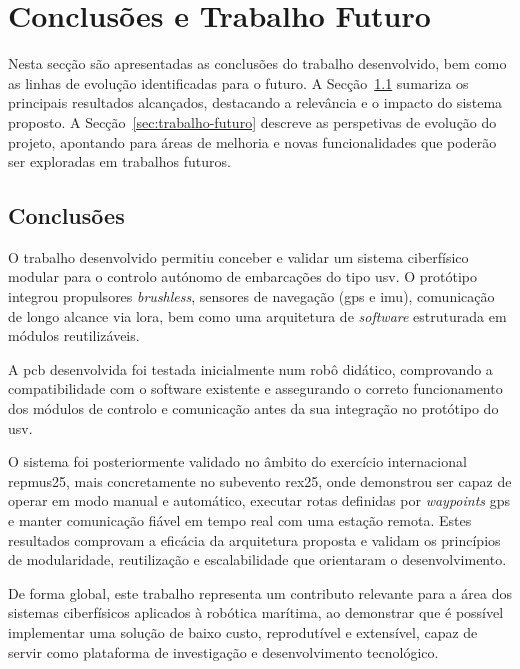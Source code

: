 \chapter{Conclusões e Trabalho Futuro}
\label{ch:conclusoesTrabalhoFuturo}

Nesta secção são apresentadas as conclusões do trabalho desenvolvido, bem como as linhas de evolução identificadas para o futuro. A Secção~\ref{sec:conclusoes} sumariza os principais resultados alcançados, destacando a relevância e o impacto do sistema proposto. A Secção~\ref{sec:trabalho-futuro} descreve as perspetivas de evolução do projeto, apontando para áreas de melhoria e novas funcionalidades que poderão ser exploradas em trabalhos futuros.

\section{Conclusões}
\label{sec:conclusoes}

O trabalho desenvolvido permitiu conceber e validar um sistema ciberfísico modular para o controlo autónomo de embarcações do tipo \gls{usv}. O protótipo integrou propulsores \emph{brushless}, sensores de navegação (\gls{gps} e \gls{imu}), comunicação de longo alcance via \gls{lora}, bem como uma arquitetura de \emph{software} estruturada em módulos reutilizáveis.  

A \gls{pcb} desenvolvida foi testada inicialmente num robô didático, comprovando a compatibilidade com o software existente e assegurando o correto funcionamento dos módulos de controlo e comunicação antes da sua integração no protótipo do \gls{usv}.  

O sistema foi posteriormente validado no âmbito do exercício internacional \gls{repmus25}, mais concretamente no subevento \gls{rex25}, onde demonstrou ser capaz de operar em modo manual e automático, executar rotas definidas por \emph{waypoints} \gls{gps} e manter comunicação fiável em tempo real com uma estação remota. Estes resultados comprovam a eficácia da arquitetura proposta e validam os princípios de modularidade, reutilização e escalabilidade que orientaram o desenvolvimento.  

De forma global, este trabalho representa um contributo relevante para a área dos sistemas ciberfísicos aplicados à robótica marítima, ao demonstrar que é possível implementar uma solução de baixo custo, reprodutível e extensível, capaz de servir como plataforma de investigação e desenvolvimento tecnológico.

